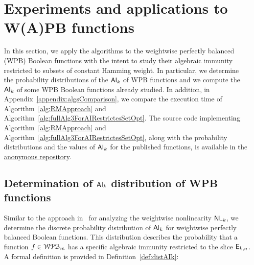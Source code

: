 \documentclass[11pt]{llncs}
\begin{document}
\section{Experiments and applications to W(A)PB functions}
In this section, we apply the algorithms to the weightwise perfectly balanced (WPB) Boolean functions with the intent to study their algebraic immunity restricted to subsets of constant Hamming weight. In particular, we determine the probability distributions of the $\mathsf{AI}_{k}$ of WPB functions and we compute the $\mathsf{AI}_{k}$ of some WPB Boolean functions already studied. In addition, in Appendix~\ref{appendix:algsComparison}, we compare the execution time of Algorithm~\ref{alg:RMApproach} and Algorithm~\ref{alg:fullAlg3ForAIRestrictesSetOpt}.
The source code implementing Algorithm~\ref{alg:RMApproach} and Algorithm~\ref{alg:fullAlg3ForAIRestrictesSetOpt}, along with the probability distributions and the values of $\mathsf{AI}_{k}$ for the published functions, is available in the \href{https://anonymous.4open.science/r/restricted_algebraic_immunity_submission-F2C0}{anonymous repository}.


\FloatBarrier
\subsection{Determination of $\mathsf{AI}_{k}$ distribution of WPB functions}\label{subsec:AIkWPB}



Similar to the approach in~\cite{Latin:GinMea23} for analyzing the weightwise nonlinearity $\mathsf{NL}_{k}$, we determine the discrete probability distribution of $\mathsf{AI}_{k}$ for weightwise perfectly balanced Boolean functions. 
This distribution describes the probability that a function $f \in \mathcal{WPB}_{m}$ has a specific algebraic immunity restricted to the slice $\mathsf{E}_{k,n}$. 
A formal definition is provided in Definition~\ref{def:distAIk}:
\end{document}
